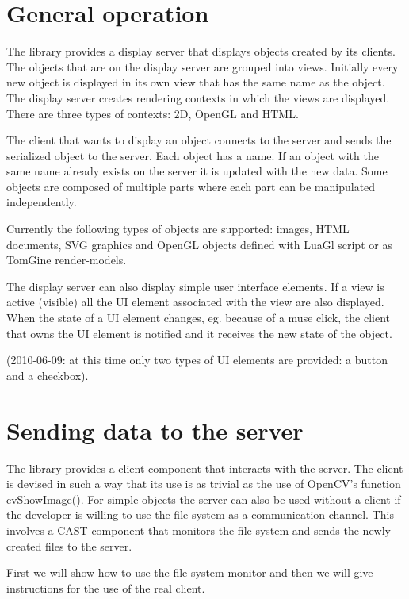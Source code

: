 \section{General operation}

The library provides a display server that displays objects created by its
clients.  The objects that are on the display server are grouped into views.
Initially every new object is displayed in its own view that has the same name
as the object.
The display server creates rendering contexts in which the views are displayed.
There are three types of contexts: 2D, OpenGL and HTML.

The client that wants to display an object connects to the server and sends the
serialized object to the server. Each object has a name. If an object with the
same name already exists on the server it is updated with the new data. Some
objects are composed of multiple parts where each part can be manipulated
independently.

Currently the following types of objects are supported: images, HTML documents,
SVG graphics and OpenGL objects defined with LuaGl script or as TomGine
render-models. 

The display server can also display simple user interface elements. If a view
is active (visible) all the UI element associated with the view are also
displayed. When the state of a UI element changes, eg.  because of a muse
click, the client that owns the UI element is notified and it receives the new
state of the object.

(2010-06-09: at this time only two types of UI elements are provided: a button
and a checkbox).

\section{Sending data to the server}

The library provides a client component that interacts with the server. The
client is devised in such a way that its use is as trivial as the use of
OpenCV's function cvShowImage(). For simple objects the server can also
be used without a client if the developer is willing to use the file system
as a communication channel. This involves a CAST component that monitors
the file system and sends the newly created files to the server.

First we will show how to use the file system monitor and then we will give
instructions for the use of the real client.

